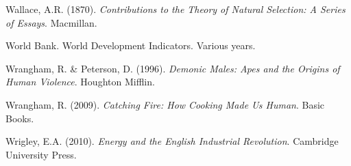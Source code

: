 Wallace, A.R. (1870). \emph{Contributions to the Theory of Natural
Selection: A Series of Essays}. Macmillan.

World Bank. World Development Indicators. Various years.

Wrangham, R. \& Peterson, D. (1996). \emph{Demonic Males: Apes and
the Origins of Human Violence}. Houghton Mifflin.

Wrangham, R. (2009). \emph{Catching Fire: How Cooking Made Us Human}.
Basic Books.

Wrigley, E.A. (2010). \emph{Energy and the English Industrial
Revolution}. Cambridge University Press.
